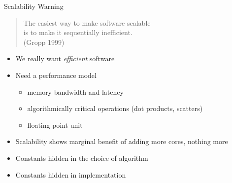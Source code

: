 \begin{frame}{Scalability Warning}
  \begin{quote}\Large \centering
    The easiest way to make software scalable \\
    is to make it sequentially inefficient. \\
    (Gropp 1999)
  \end{quote}

  \begin{itemize}
  \item We really want \emph{efficient} software
  \item Need a performance model
    \begin{itemize}
    \item memory bandwidth and latency
    \item algorithmically critical operations (\eg dot products, scatters)
    \item floating point unit
    \end{itemize}
  \item Scalability shows marginal benefit of adding more cores, nothing more
  \item Constants hidden in the choice of algorithm
  \item Constants hidden in implementation
  \end{itemize}
\end{frame}
